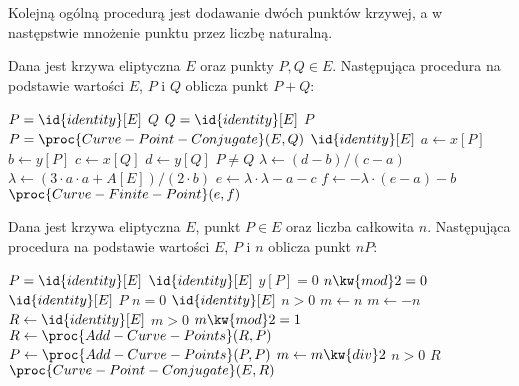 Kolejną ogólną procedurą jest dodawanie dwóch punktów krzywej,
a w następstwie mnożenie punktu przez liczbę naturalną.

\begin{algorithm}
Dana jest krzywa eliptyczna $E$
oraz punkty $P, Q \in E$.
Następująca procedura
na podstawie wartości $E$, $P$ i $Q$
oblicza
punkt $P + Q$:

\begin{codebox}
\li
    \If $P = \id{identity}[E]$
\li
        \Then
            \Return $Q$
        \End
\li
    \If $Q = \id{identity}[E]$
\li
        \Then
            \Return $P$
        \End
\li
    \If $P = \proc{Curve-Point-Conjugate}(E, Q)$
\li
        \Then
            \Return $\id{identity}[E]$
        \End
\li
    $a \gets x[P]$
\li
    $b \gets y[P]$
\li
    $c \gets x[Q]$
\li
    $d \gets y[Q]$
\li
    \If $P \neq Q$
\li
        \Then
            $\lambda \gets (d - b)/(c - a)$
\li
        \Else
            $\lambda \gets (3\cdot a\cdot a + A[E])/(2\cdot b)$
        \End
\li
    $e \gets \lambda\cdot\lambda - a - c$
\li
    $f \gets -\lambda\cdot(e - a) - b$
\li
    \Return $\proc{Curve-Finite-Point}(e, f)$
\end{codebox}
\end{algorithm}

\begin{algorithm}
Dana jest krzywa eliptyczna $E$,
punkt $P \in E$ oraz liczba całkowita $n$.
Następująca procedura
na podstawie wartości $E$, $P$ i $n$
oblicza
punkt $nP$:

\begin{codebox}
\li
    \If $P = \id{identity}[E]$
\li
        \Then
            \Return $\id{identity}[E]$
        \End
\li
    \If $y[P] = 0$
\li
        \Then
            \If $n \kw{ mod } 2 = 0$
\li
                \Then
                    \Return $\id{identity}[E]$
\li
                \Else
                    \Return $P$
                \End
        \End
\li
    \If $n = 0$
\li
        \Then
            \Return $\id{identity}[E]$
        \End
\li
    \If $n > 0$
\li
        \Then
            $m \gets n$
\li
        \Else
            $m \gets -n$
        \End
\li
    $R \gets \id{identity}[E]$
\li
    \While $m > 0$
\li
        \Do
            \If $m \kw{ mod } 2 = 1$
\li
                \Then
                    $R \gets \proc{Add-Curve-Points}(R, P)$
                \End
\li
            $P \gets \proc{Add-Curve-Points}(P, P)$
\li
            $m \gets m \kw{ div } 2$
        \End
\li
    \If $n > 0$
\li
        \Then
            \Return $R$
\li
        \Else
            \Return $\proc{Curve-Point-Conjugate}(E, R)$
        \End
\end{codebox}
\end{algorithm}

